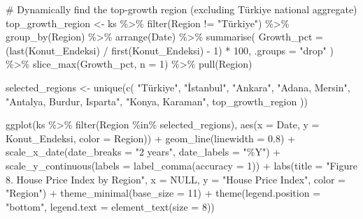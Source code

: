 \documentclass[
  11pt,
  a4paper,
]{article}
\newenvironment{Shaded}{\begin{snugshade}}{\end{snugshade}}
\newcommand{\AttributeTok}[1]{\textcolor[rgb]{0.40,0.45,0.13}{#1}}
\newcommand{\CommentTok}[1]{\textcolor[rgb]{0.37,0.37,0.37}{#1}}
\newcommand{\ConstantTok}[1]{\textcolor[rgb]{0.56,0.35,0.01}{#1}}
\newcommand{\DecValTok}[1]{\textcolor[rgb]{0.68,0.00,0.00}{#1}}
\newcommand{\FloatTok}[1]{\textcolor[rgb]{0.68,0.00,0.00}{#1}}
\newcommand{\FunctionTok}[1]{\textcolor[rgb]{0.28,0.35,0.67}{#1}}
\newcommand{\NormalTok}[1]{\textcolor[rgb]{0.00,0.23,0.31}{#1}}
\newcommand{\OtherTok}[1]{\textcolor[rgb]{0.00,0.23,0.31}{#1}}
\newcommand{\SpecialCharTok}[1]{\textcolor[rgb]{0.37,0.37,0.37}{#1}}
\newcommand{\StringTok}[1]{\textcolor[rgb]{0.13,0.47,0.30}{#1}}
\begin{document}
\begin{Shaded}
\begin{Highlighting}[]
\CommentTok{\# Dynamically find the top{-}growth region (excluding Türkiye national aggregate)}
\NormalTok{top\_growth\_region }\OtherTok{\textless{}{-}}\NormalTok{ ks }\SpecialCharTok{\%\textgreater{}\%}
  \FunctionTok{filter}\NormalTok{(Region }\SpecialCharTok{!=} \StringTok{"Türkiye"}\NormalTok{) }\SpecialCharTok{\%\textgreater{}\%}
  \FunctionTok{group\_by}\NormalTok{(Region) }\SpecialCharTok{\%\textgreater{}\%}
  \FunctionTok{arrange}\NormalTok{(Date) }\SpecialCharTok{\%\textgreater{}\%}
  \FunctionTok{summarise}\NormalTok{(}
    \AttributeTok{Growth\_pct =}\NormalTok{ (}\FunctionTok{last}\NormalTok{(Konut\_Endeksi) }\SpecialCharTok{/} \FunctionTok{first}\NormalTok{(Konut\_Endeksi) }\SpecialCharTok{{-}} \DecValTok{1}\NormalTok{) }\SpecialCharTok{*} \DecValTok{100}\NormalTok{,}
    \AttributeTok{.groups =} \StringTok{"drop"}
\NormalTok{  ) }\SpecialCharTok{\%\textgreater{}\%}
  \FunctionTok{slice\_max}\NormalTok{(Growth\_pct, }\AttributeTok{n =} \DecValTok{1}\NormalTok{) }\SpecialCharTok{\%\textgreater{}\%}
  \FunctionTok{pull}\NormalTok{(Region)}

\NormalTok{selected\_regions }\OtherTok{\textless{}{-}} \FunctionTok{unique}\NormalTok{(}\FunctionTok{c}\NormalTok{(}
  \StringTok{"Türkiye"}\NormalTok{, }\StringTok{"İstanbul"}\NormalTok{, }\StringTok{"Ankara"}\NormalTok{,}
  \StringTok{"Adana, Mersin"}\NormalTok{, }\StringTok{"Antalya, Burdur, Isparta"}\NormalTok{,}
  \StringTok{"Konya, Karaman"}\NormalTok{,}
\NormalTok{  top\_growth\_region}
\NormalTok{))}

\FunctionTok{ggplot}\NormalTok{(ks }\SpecialCharTok{\%\textgreater{}\%} \FunctionTok{filter}\NormalTok{(Region }\SpecialCharTok{\%in\%}\NormalTok{ selected\_regions),}
       \FunctionTok{aes}\NormalTok{(}\AttributeTok{x =}\NormalTok{ Date, }\AttributeTok{y =}\NormalTok{ Konut\_Endeksi, }\AttributeTok{color =}\NormalTok{ Region)) }\SpecialCharTok{+}
  \FunctionTok{geom\_line}\NormalTok{(}\AttributeTok{linewidth =} \FloatTok{0.8}\NormalTok{) }\SpecialCharTok{+}
  \FunctionTok{scale\_x\_date}\NormalTok{(}\AttributeTok{date\_breaks =} \StringTok{"2 years"}\NormalTok{, }\AttributeTok{date\_labels =} \StringTok{"\%Y"}\NormalTok{) }\SpecialCharTok{+}
  \FunctionTok{scale\_y\_continuous}\NormalTok{(}\AttributeTok{labels =} \FunctionTok{label\_comma}\NormalTok{(}\AttributeTok{accuracy =} \DecValTok{1}\NormalTok{)) }\SpecialCharTok{+}
  \FunctionTok{labs}\NormalTok{(}\AttributeTok{title =} \StringTok{"Figure 8. House Price Index by Region"}\NormalTok{,}
       \AttributeTok{x =} \ConstantTok{NULL}\NormalTok{, }\AttributeTok{y =} \StringTok{"House Price Index"}\NormalTok{, }\AttributeTok{color =} \StringTok{"Region"}\NormalTok{) }\SpecialCharTok{+}
  \FunctionTok{theme\_minimal}\NormalTok{(}\AttributeTok{base\_size =} \DecValTok{11}\NormalTok{) }\SpecialCharTok{+}
  \FunctionTok{theme}\NormalTok{(}\AttributeTok{legend.position =} \StringTok{"bottom"}\NormalTok{,}
        \AttributeTok{legend.text =} \FunctionTok{element\_text}\NormalTok{(}\AttributeTok{size =} \DecValTok{8}\NormalTok{))}
\end{Highlighting}
\end{Shaded}
\end{document}
